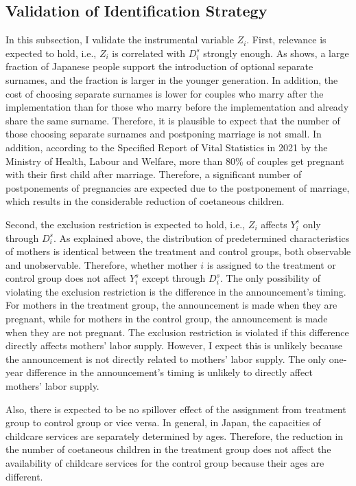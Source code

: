 \documentclass[12pt]{article}
\begin{document}
\subsection*{Validation of Identification Strategy}
In this subsection, I validate the instrumental variable $Z_i$.
First, relevance is expected to hold, i.e., $Z_i$ is correlated with $D_i^s$ strongly enough. 
As \cite{nhk} shows, a large fraction of Japanese people support the introduction of optional separate surnames, and the fraction is larger in the younger generation.
In addition, the cost of choosing separate surnames is lower for couples who marry after the implementation than for those who marry before the implementation and already share the same surname.
Therefore, it is plausible to expect that the number of those choosing separate surnames and postponing marriage is not small. 
In addition, according to the Specified Report of Vital Statistics in 2021 by the Ministry of Health, Labour and Welfare, more than 80\% of couples get pregnant with their first child after marriage.
Therefore, a significant number of postponements of pregnancies are expected due to the postponement of marriage, which results in the considerable reduction of coetaneous children.


Second, the exclusion restriction is expected to hold, i.e., $Z_i$ affects $Y_i^s$ only through $D_i^s$.
As explained above, the distribution of predetermined characteristics of mothers is identical between the treatment and control groups, both observable and unobservable.
Therefore, whether mother $i$ is assigned to the treatment or control group does not affect $Y_i^s$ except through $D_i^s$.
The only possibility of violating the exclusion restriction is the difference in the announcement's timing. 
For mothers in the treatment group, the announcement is made when they are pregnant, while for mothers in the control group, the announcement is made when they are not pregnant.
The exclusion restriction is violated if this difference directly affects mothers' labor supply.
However, I expect this is unlikely because the announcement is not directly related to mothers' labor supply.
The only one-year difference in the announcement's timing is unlikely to directly affect mothers' labor supply.


Also, there is expected to be no spillover effect of the assignment from treatment group to control group or vice versa.
In general, in Japan, the capacities of childcare services are separately determined by ages. 
Therefore, the reduction in the number of coetaneous children in the treatment group does not affect the availability of childcare services for the control group because their ages are different.
\end{document}
